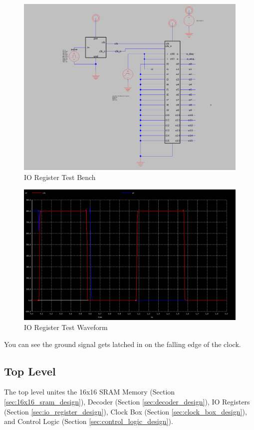 \documentclass[a4paper]{article}
\begin{document}
\begin{figure}[H]
	\centering
	\includegraphics[scale=0.3]{ioRegisterTest}
	\caption{IO Register Test Bench}
	\label{fig:ioRegisterTest}
\end{figure}

\begin{figure}[H]
	\centering
	\includegraphics[scale=0.3]{ioRegisterWaveform}
	\caption{IO Register Test Waveform}
	\label{fig:ioRegisterWaveform}
\end{figure}

You can see the ground signal gets latched in on the falling edge of the clock.



\newpage
\subsection{Top Level}
The top level unites the 16x16 SRAM Memory (Section \ref{sec:16x16_sram_design}), Decoder (Section \ref{sec:decoder_design}), IO Registers (Section \ref{sec:io_register_design}), Clock Box (Section \ref{sec:clock_box_design}), and Control Logic (Section \ref{sec:control_logic_design}). 
\end{document}
